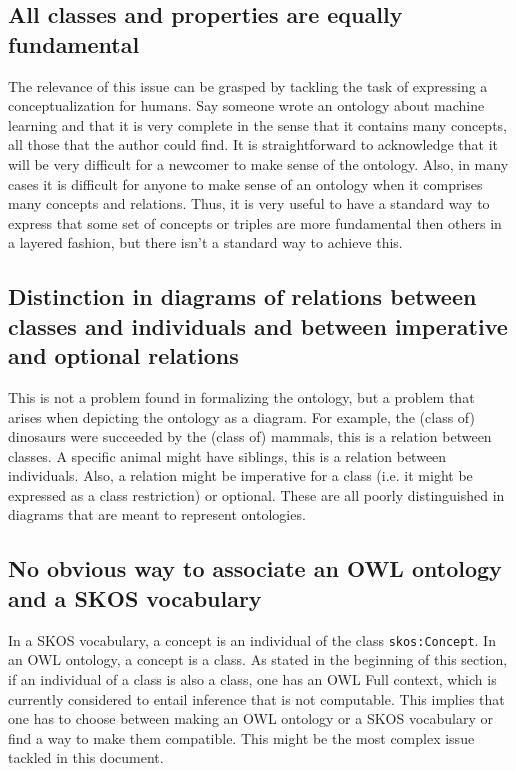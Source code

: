 \documentclass[12pt,fleqn]{article}
\begin{document}
\subsection{All classes and properties are equally fundamental}\label{sec:fun}
The relevance of this issue can be grasped by
tackling the task of expressing a conceptualization for humans.
Say someone wrote an ontology about machine learning and that it is very complete
in the sense that it contains many concepts, all those that the author could find.
It is straightforward to acknowledge that it will be very difficult for a newcomer
to make sense of the ontology.
Also, in many cases it is difficult for anyone to make sense of an ontology when it
comprises many concepts and relations.
Thus, it is very useful to have a standard way to express that some set of
concepts or triples are more fundamental then others in a layered fashion,
but there isn't a standard way to achieve this.

\subsection{Distinction in diagrams of relations between classes and individuals and between imperative and optional relations}\label{sec:dia}
This is not a problem found in formalizing the ontology,
but a problem that arises when depicting the ontology as a diagram.
For example, the (class of) dinosaurs were succeeded by the (class of) mammals,
this is a relation between classes.
A specific animal might have siblings, this is a relation between individuals.
Also, a relation might be imperative for a class (i.e. it might be expressed as a class restriction)
or optional.
These are all poorly distinguished in diagrams that are meant to represent ontologies.

\subsection{No obvious way to associate an OWL ontology and a SKOS vocabulary}
In a SKOS vocabulary, a concept is an individual of the class \texttt{skos:Concept}.
In an OWL ontology, a concept is a class.
As stated in the beginning of this section, 
if an individual of a class is also a class,
one has an OWL Full context, which is
currently considered to entail inference that is not computable.
This implies that one has to choose between making
an OWL ontology or a SKOS vocabulary or find a way to
make them compatible.
This might be the most complex issue tackled in this document.
\end{document}
